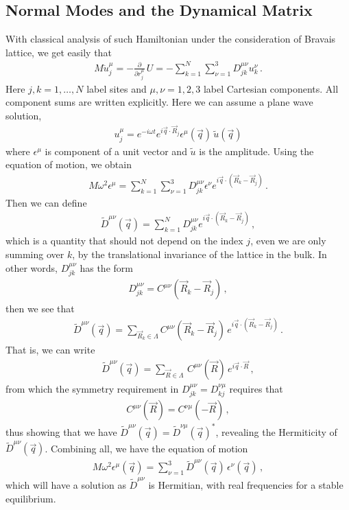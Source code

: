 \documentclass[11pt, oneside]{book}
\theoremstyle{break}
\theoremstyle{break}
\newcommand{\pd}{\partial}
\newcommand{\that}[1]{\widetilde{#1}}
\begin{document}
\subsection{Normal Modes and the Dynamical Matrix}
With classical analysis of such Hamiltonian under the consideration of Bravais lattice, we get easily that 
\begin{align*}
M\ddot{u}^{\mu}_{j} = -\frac{\pd}{\pd r_j^\mu} \, U = -\sum_{k=1}^N\sum_{\nu=1}^3 D_{jk}^{\mu\nu}u_k^{\nu}\,.
\end{align*}
Here $j,k=1,\ldots,N$ label sites and $\mu,\nu=1,2,3$ label Cartesian components. All component sums are written explicitly.
Here we can assume a plane wave solution, 
\begin{align*}
u_{j}^\mu = e^{-i\omega t} e^{i\vec{q}\cdot \vec{R}_j} \epsilon^\mu(\vec{q}) \, \that{u}(\vec{q})
\end{align*}
where $\epsilon^\mu$ is component of a unit vector and $\that{u}$ is the amplitude. Using the equation of motion, we obtain 
\begin{align*}
M\omega^2 \epsilon^\mu =\sum_{k=1}^N\sum_{\nu=1}^3 D_{jk}^{\mu\nu} \epsilon^\nu e^{i\vec{q}\cdot (\vec{R}_k - \vec{R}_j)}\,.
\end{align*}
Then we can define 
\begin{align*}
\that{D}^{\mu\nu}(\vec{q}) = \sum_{k=1}^N D_{jk}^{\mu\nu} e^{i\vec{q}\cdot (\vec{R}_k - \vec{R}_j)}\,,
\end{align*}
which is a quantity that should not depend on the index $j$, even we are only summing over $k$, by the translational invariance of the lattice in the bulk. In other words, $D_{jk}^{\mu\nu}$ has the form 
\begin{align*}
D_{jk}^{\mu\nu} = C^{\mu\nu}(\vec{R}_k - \vec{R}_j)\,,
\end{align*}
then we see that 
\begin{align*}
\that{D}^{\mu\nu}(\vec{q}) = \sum_{\vec{R}_k \in \Lambda}C^{\mu\nu}(\vec{R}_k - \vec{R}_j) \, e^{i\vec{q}\cdot (\vec{R}_k - \vec{R}_j)}\,.
\end{align*}
That is, we can write
\begin{align*}
\that{D}^{\mu\nu}(\vec{q}) = \sum_{\vec{R}\in \Lambda} \, C^{\mu\nu}(\vec{R}) \, e^{i\vec{q}\cdot \vec{R}}\,,
\end{align*}
from which the symmetry requirement in $D^{\mu\nu}_{jk} = D^{\nu\mu}_{kj}$ requires that 
\begin{align*}
C^{\mu\nu}(\vec{R}) = C^{\nu\mu}(-\vec{R})\,,
\end{align*}
thus showing that we have $\that{D}^{\mu\nu}(\vec{q}) = \that{D}^{\nu\mu}(\vec{q})^*$, revealing the Hermiticity of $\that{D}^{\mu\nu}(\vec{q})$. Combining all, we have the equation of motion 
\begin{align*}
M\omega^2 \epsilon^{\mu}(\vec{q}) = \sum_{\nu=1}^3\that{D}^{\mu\nu}(\vec{q}) \, \epsilon^\nu(\vec{q})\,,
\end{align*}
which will have a solution as $\that{D}^{\mu\nu}$ is Hermitian, with real frequencies for a stable equilibrium.\\
\end{document}
